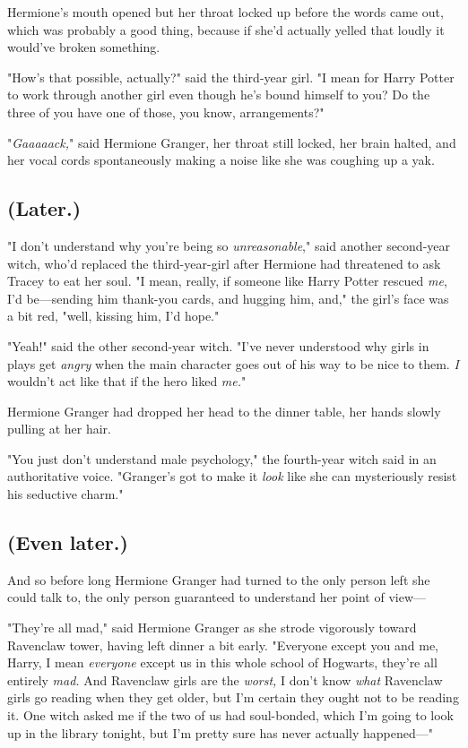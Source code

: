 Hermione's mouth opened but her throat locked up before the words came out, 
which was probably a good thing, because if she'd actually yelled that loudly 
it would've broken something.

"How's that possible, actually?" said the third-year girl. "I mean for Harry 
Potter to work through another girl even though he's bound himself to you? Do 
the three of you have one of those, you know, arrangements?"

"\emph{Gaaaaack,}" said Hermione Granger, her throat still locked, her brain 
halted, and her vocal cords spontaneously making a noise like she was coughing 
up a yak.
\sbreak
\subsection{(Later.)}

"I don't understand why you're being so \emph{unreasonable}," said another 
second-year witch, who'd replaced the third-year-girl after Hermione had 
threatened to ask Tracey to eat her soul. "I mean, really, if someone like 
Harry Potter rescued \emph{me}, I'd be---sending him thank-you cards, and 
hugging him, and," the girl's face was a bit red, "well, kissing him, I'd hope."

"Yeah!" said the other second-year witch. "I've never understood why girls in 
plays get \emph{angry} when the main character goes out of his way to be nice 
to them. \emph{I} wouldn't act like that if the hero liked \emph{me.}"

Hermione Granger had dropped her head to the dinner table, her hands slowly 
pulling at her hair.

"You just don't understand male psychology," the fourth-year witch said in an 
authoritative voice. "Granger's got to make it \emph{look} like she can 
mysteriously resist his seductive charm."
\sbreak
\subsection{(Even later.)}

And so before long Hermione Granger had turned to the only person left she 
could talk to, the only person guaranteed to understand her point of view---

"They're all mad," said Hermione Granger as she strode vigorously toward 
Ravenclaw tower, having left dinner a bit early. "Everyone except you and me, 
Harry, I mean \emph{everyone} except us in this whole school of Hogwarts, 
they're all entirely \emph{mad.} And Ravenclaw girls are the \emph{worst,} I 
don't know \emph{what} Ravenclaw girls go reading when they get older, but I'm 
certain they ought not to be reading it. One witch asked me if the two of us 
had soul-bonded, which I'm going to look up in the library tonight, but I'm 
pretty sure has never actually happened---"

